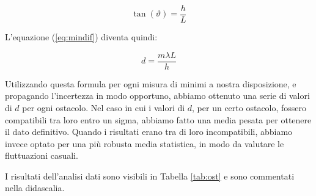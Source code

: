 \begin{equation}
    \tan(\vartheta) = \frac{h}{L}
\end{equation}

L'equazione (\ref{eq:mindif}) diventa quindi:

\begin{equation}
    d = \frac{m\lambda L}{h}
    \label{eq:mindifsimpl}
\end{equation}

Utilizzando questa formula per ogni misura di minimi a nostra disposizione, e propagando l'incertezza in modo opportuno,
abbiamo ottenuto una serie di valori di $d$ per ogni ostacolo. Nel caso in cui i valori di $d$, per un certo ostacolo,
fossero compatibili tra loro entro un sigma, abbiamo fatto una media pesata per ottenere il dato definitivo. Quando
i risultati erano tra di loro incompatibili, abbiamo invece optato per una più robusta media statistica, in modo da
valutare le fluttuazioni casuali.

I risultati dell'analisi dati sono visibili in Tabella \ref{tab:ost} e sono commentati nella didascalia.

